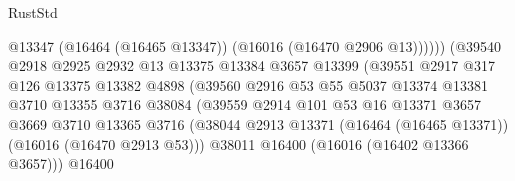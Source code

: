 \begin{lexlean}{RustStd}
\begin{coremodule}
                                              @13347
                                              (@16464 (@16465 @13347))
                                              (@16016 (@16470 @2906 @13))))))
                                      (@39540
                                        @2918
                                        @2925
                                        @2932
                                        @13
                                        @13375
                                        @13384
                                        @3657
                                        @13399
                                        (@39551
                                          @2917
                                          @317
                                          @126
                                          @13375
                                          @13382
                                          @4898
                                          (@39560
                                            @2916
                                            @53
                                            @55
                                            @5037
                                            @13374
                                            @13381
                                            @3710
                                            @13355
                                            @3716
                                            @38084
                                            (@39559
                                              @2914
                                              @101
                                              @53
                                              @16
                                              @13371
                                              @3657
                                              @3669
                                              @3710
                                              @13365
                                              @3716
                                              (@38044
                                                @2913
                                                @13371
                                                (@16464 (@16465 @13371))
                                                (@16016 (@16470 @2913 @53)))
                                              @38011
                                              @16400
                                              (@16016 (@16402 @13366 @3657)))
                                            @16400

\end{coremodule}
\end{lexlean}

